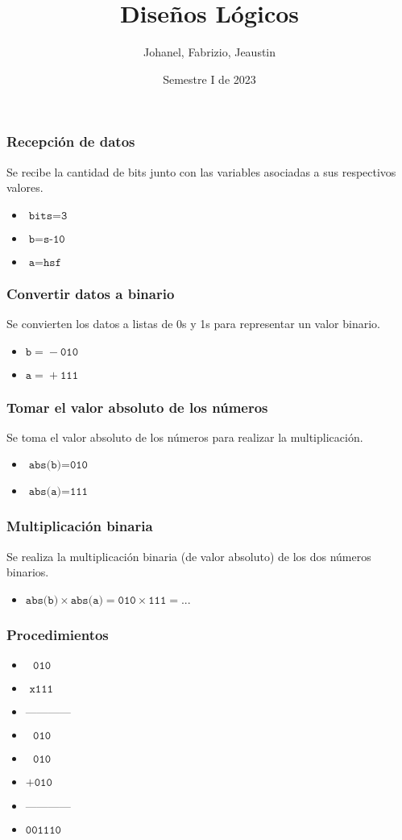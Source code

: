 \documentclass{beamer}
\title{Diseños Lógicos}
\author{Johanel, Fabrizio, Jeaustin}
\institute{Tecnológico de Costa Rica}
\date{Semestre I de 2023}
\begin{document}
\begin{frame}
\frametitle{Recepción de datos}
Se recibe la cantidad de bits junto con las variables asociadas a sus respectivos valores.
\begin{itemize}
\item $\texttt{bits}=\texttt{3}$
\item $\texttt{b}=\texttt{s-10}$
\item $\texttt{a}=\texttt{hsf}$
\end{itemize}
\end{frame}
\begin{frame}
\frametitle{Convertir datos a binario}
Se convierten los datos a listas de 0s y 1s para representar un valor binario.
\begin{itemize}
\item $\texttt{b}=\texttt{}-\texttt{010}$
\item $\texttt{a}=\texttt{}+\texttt{111}$
\end{itemize}
\end{frame}
\begin{frame}
\frametitle{Tomar el valor absoluto de los números}
Se toma el valor absoluto de los números para realizar la multiplicación.
\begin{itemize}
\item $\texttt{abs(b)}=\texttt{010}$
\item $\texttt{abs(a)}=\texttt{111}$
\end{itemize}
\end{frame}
\begin{frame}
\frametitle{Multiplicación binaria}
Se realiza la multiplicación binaria (de valor absoluto) de los dos números binarios.
\begin{itemize}
\item $\texttt{abs(b)}\times\texttt{abs(a)}=\texttt{010}\times\texttt{111}=\texttt{...}$
\end{itemize}
\end{frame}
\begin{frame}
\frametitle{Procedimientos}

\begin{itemize}
\item $\texttt{\ \ \ }\texttt{010}$
\item $\texttt{\ \ x}\texttt{111}$
\item $\text{------------}\text{}$
\item $\texttt{\ \ \ }\texttt{010}$
\item $\texttt{\ \ }\texttt{010}$
\item $\texttt{+}\texttt{010}$
\item $\text{------------}\text{}$
\item $\texttt{}\texttt{001110}$
\end{itemize}
\end{frame}
\end{document}
